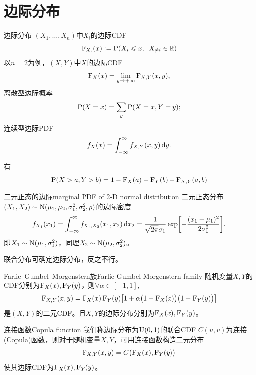 \section{边际分布}

\begin{definition}{边际分布}{}
	$(X_1,\ldots,X_n)$中$X_i$的边际CDF
	\begin{equation}
		\CDF_{X_i}(x) := \P(X_i \leqslant x,\enspace X_{\neq i} \in \RR)
	\end{equation}
	以$n = 2$为例，$(X,Y)$中$X$的边际CDF
	\[
		\CDF_X(x) = \lim_{y\to+\infty}\CDF_{X,Y}(x,y),
	\]
	离散型边际概率
	\begin{equation}\label{eq:ps-marginal-mass}
		\P(X = x) = \sum_y\P(X = x,Y = y);
	\end{equation}
	连续型边际PDF
	\begin{equation}\label{eq:ps-marginal-density}
		f_X(x) = \intR f_{X,Y}(x,y)\d y.
	\end{equation}
\end{definition}

\begin{corollary}
	有 
	\begin{equation}\label{eq:ps-joint-survival}
		\P(X > a,Y > b) = 1 - \CDF_X(a) - \CDF_Y(b) + \CDF_{X,Y}(a,b)
	\end{equation}
\end{corollary}

\begin{example}{二元正态的边际}{marginal PDF of 2-D normal distribution}
	二元正态分布$(X_1,X_2) \sim \NormalDist(\mu_1,\mu_2,\sigma_1^2,\sigma_2^2,\rho)$的边际密度
	\[
		f_{X_1}(x_1) = \intR f_{X_1,X_2}(x_1,x_2)\d x_2 = \frac1{\sqrt{2\pi}\sigma_1}\exp\biggb{-\frac{(x_1 - \mu_1)^2}{2\sigma_1^2}}.
	\]
	即$X_1 \sim \NormalDist(\mu_1,\sigma_1^2)$，同理$X_2 \sim \NormalDist(\mu_2,\sigma_2^2)$。
\end{example}
\begin{remark}
	联合分布可确定边际分布，反之不行。
\end{remark}
\begin{example}{Farlie--Gumbel--Morgenstern族}{Farlie-Gumbel-Morgenstern family}
	随机变量$X,Y$的CDF分别为$\CDF_X(x),\CDF_Y(y)$，则$\forall\alpha \in [-1,1],$
	\begin{equation}
		\CDF_{X,Y}(x,y) = \CDF_X(x)\CDF_Y(y)\bigb{1 + \alpha\bigp{1 - \CDF_X(x)}\bigp{1 - \CDF_Y(y)}}
	\end{equation}
	是$(X,Y)$的二元CDF。且$X,Y$的边际分布分别为$\CDF_X(x),\CDF_Y(y)$。
\end{example}
\begin{example}{连接函数}{Copula function}
	我们称边际分布为$\UnifDist(0,1)$的联合CDF $C(u,v)$为连接(Copula)函数，则对于随机变量$X,Y$，可用连接函数构造二元分布
	\begin{equation}
		\CDF_{X,Y}(x,y) = C\bigp{\CDF_X(x),\CDF_Y(y)}
	\end{equation}
	使其边际CDF为$\CDF_X(x),\CDF_Y(y)$。
\end{example}

